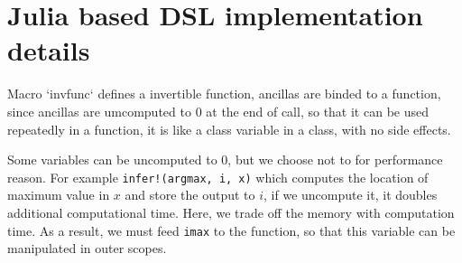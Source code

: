 \documentclass{article}
\newcommand{\<}{\langle}
\renewcommand{\>}{\rangle}
\begin{document}
\section{Julia based DSL implementation details}

Macro `invfunc` defines a invertible function, ancillas are binded to a function, since ancillas are umcomputed to $0$ at the end of call, so that it can be used repeatedly in a function, it is like a class variable in a class, with no side effects.

Some variables can be uncomputed to $0$, but we choose not to for performance reason. For example
\texttt{infer!(argmax, i, x)} which computes the location of maximum value in $x$ and store the output to $i$, if we uncompute it, it doubles additional computational time. Here, we trade off the memory with computation time. As a result, we must feed \texttt{imax} to the function, so that this variable can be manipulated in outer scopes.
\end{document}
